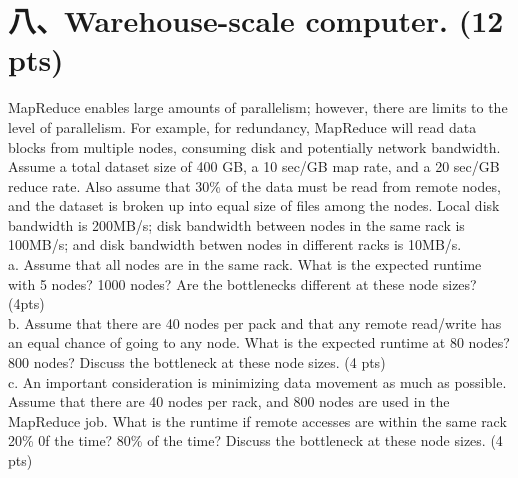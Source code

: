 \documentclass[UTF8]{ctexart}
\begin{document}
\section*{八、Warehouse-scale computer. (12 pts)}
MapReduce enables large amounts of parallelism; however, there are limits to the level of parallelism. For example, for redundancy, MapReduce will 
read data blocks from multiple nodes, consuming disk and potentially network bandwidth. Assume a total dataset size of 400 GB, a 10 sec/GB map rate, 
and a 20 sec/GB reduce rate. Also assume that 30\% of the data must be read from remote nodes, and the dataset is broken up into equal size of files 
among the nodes. Local disk bandwidth is 200MB/s; disk bandwidth between nodes in the same rack is 100MB/s; and disk bandwidth betwen nodes in 
different racks is 10MB/s.\\
a. Assume that all nodes are in the same rack. What is the expected runtime with 5 nodes? 1000 nodes? Are the bottlenecks different at these node 
sizes? (4pts)\\
b. Assume that there are 40 nodes per pack and that any remote read/write has an equal chance of going to any node. What is the expected runtime at 
80 nodes? 800 nodes? Discuss the bottleneck at these node sizes. (4 pts)\\
c. An important consideration is minimizing data movement as much as possible. Assume that there are 40 nodes per rack, and 800 nodes are used in the 
MapReduce job. What is the runtime if remote accesses are within the same rack 20\% 0f the time? 80\% of the time? Discuss the bottleneck at these 
node sizes. (4 pts)\\
\end{document}
